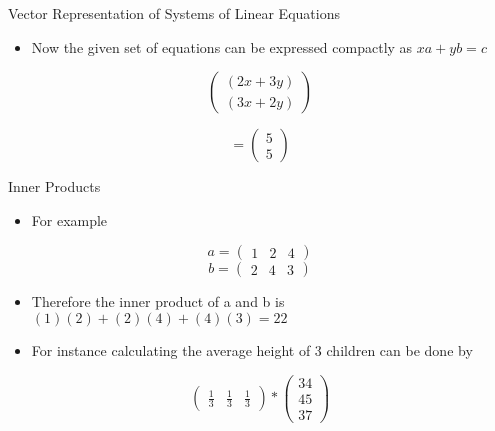 \documentclass[
  ignorenonframetext,
]{beamer}
\providecommand{\tightlist}{%
  \setlength{\itemsep}{0pt}\setlength{\parskip}{0pt}}
\begin{document}
\begin{frame}{Vector Representation of Systems of Linear Equations}
\protect\hypertarget{vector-representation-of-systems-of-linear-equations-1}{}

\begin{itemize}
\tightlist
\item
  Now the given set of equations can be expressed compactly as
  \(xa + yb = c\)
\end{itemize}

\[ \begin{pmatrix}
   (2x+3y) \\ 
 (3x+2y) 
 \end{pmatrix}\]

\[ = \begin{pmatrix} 5 \\ 5 \end{pmatrix}\]

\end{frame}

\begin{frame}{Inner Products}
\protect\hypertarget{inner-products}{}

\begin{itemize}
\tightlist
\item
  For example
\end{itemize}

\[a = \begin{pmatrix} 1 & 2 & 4 \end{pmatrix}\]
\[b = \begin{pmatrix} 2 & 4 & 3 \end{pmatrix}\]

\begin{itemize}
\item
  Therefore the inner product of a and b is
  \((1)(2) + (2)(4)+ (4)(3) = 22\)
\item
  For instance calculating the average height of 3 children can be done
  by
\end{itemize}

\[\begin{pmatrix} \frac{1}{3} & \frac{1}{3} & \frac{1}{3} \end{pmatrix}* \begin{pmatrix} 34 \\ 45 \\ 37 \end{pmatrix}\]

\end{frame}
\end{document}
